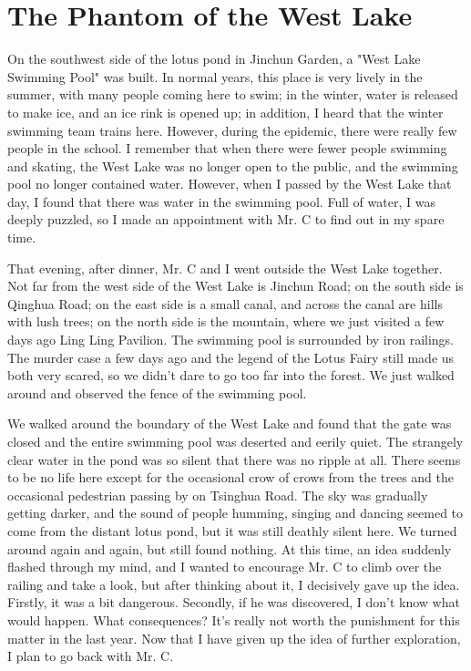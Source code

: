 \chapter{The Phantom of the West Lake}

On the southwest side of the lotus pond in Jinchun Garden, a "West Lake
Swimming Pool" was built.  In normal years, this place is very lively in the
summer, with many people coming here to swim; in the winter, water is released
to make ice, and an ice rink is opened up; in addition, I heard that the winter
swimming team trains here.  However, during the epidemic, there were really few
people in the school. I remember that when there were fewer people swimming and
skating, the West Lake was no longer open to the public, and the swimming pool
no longer contained water. However, when I passed by the West Lake that day, I
found that there was water in the swimming pool. Full of water, I was deeply
puzzled, so I made an appointment with Mr. C to find out in my spare time.

That evening, after dinner, Mr. C and I went outside the West Lake together.
Not far from the west side of the West Lake is Jinchun Road; on the south side
is Qinghua Road; on the east side is a small canal, and across the canal are
hills with lush trees; on the north side is the mountain, where we just visited
a few days ago Ling Ling Pavilion. The swimming pool is surrounded by iron
railings.  The murder case a few days ago and the legend of the Lotus Fairy
still made us both very scared, so we didn't dare to go too far into the
forest. We just walked around and observed the fence of the swimming pool.

We walked around the boundary of the West Lake and found that the gate was
closed and the entire swimming pool was deserted and eerily quiet. The
strangely clear water in the pond was so silent that there was no ripple at
all. There seems to be no life here except for the occasional crow of crows
from the trees and the occasional pedestrian passing by on Tsinghua Road.  The
sky was gradually getting darker, and the sound of people humming, singing and
dancing seemed to come from the distant lotus pond, but it was still deathly
silent here.  We turned around again and again, but still found nothing. At
this time, an idea suddenly flashed through my mind, and I wanted to encourage
Mr. C to climb over the railing and take a look, but after thinking about it, I
decisively gave up the idea. Firstly, it was a bit dangerous. Secondly, if he
was discovered, I don’t know what would happen. What consequences? It's really
not worth the punishment for this matter in the last year. Now that I have
given up the idea of further exploration, I plan to go back with Mr. C.

